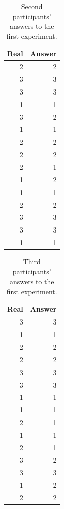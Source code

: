 \documentclass[uplatex,
12pt, %
a4paper,
english, %
oneside,
titlepage,
singlespacing, %
liststotoc, %
headsepline,
]{MastersDoctoralThesis} %
\begin{document}
\begin{appendices}
\begin{table}[H]
  \centering
  \caption{Second participants' answers to the first experiment.}
    \begin{tabular}{|r|r|}
    \toprule
    \multicolumn{1}{|l|}{Real} & \multicolumn{1}{l|}{Answer} \\
    \midrule
    2     & 2 \\
    \midrule
    3     & 3 \\
    \midrule
    3     & 3 \\
    \midrule
    1     & 1 \\
    \midrule
    3     & 2 \\
    \midrule
    1     & 1 \\
    \midrule
    2     & 2 \\
    \midrule
    2     & 2 \\
    \midrule
    2     & 1 \\
    \midrule
    1     & 2 \\
    \midrule
    1     & 1 \\
    \midrule
    2     & 2 \\
    \midrule
    3     & 3 \\
    \midrule
    3     & 3 \\
    \midrule
    1     & 1 \\
    \bottomrule
    \end{tabular}%
  \label{tab:Ex1_2}%
\end{table}%

\begin{table}[H]
  \centering
  \caption{Third participants' answers to the first experiment.}
    \begin{tabular}{|r|r|}
    \toprule
    \multicolumn{1}{|l|}{Real} & \multicolumn{1}{l|}{Answer} \\
    \midrule
    3     & 3 \\
    \midrule
    1     & 1 \\
    \midrule
    2     & 2 \\
    \midrule
    2     & 2 \\
    \midrule
    3     & 3 \\
    \midrule
    3     & 3 \\
    \midrule
    1     & 1 \\
    \midrule
    1     & 1 \\
    \midrule
    2     & 1 \\
    \midrule
    1     & 1 \\
    \midrule
    2     & 1 \\
    \midrule
    3     & 2 \\
    \midrule
    3     & 3 \\
    \midrule
    1     & 2 \\
    \midrule
    2     & 2 \\
    \bottomrule
    \end{tabular}%
  \label{tab:Ex1_3}%
\end{table}%


\end{appendices}
\end{document}
